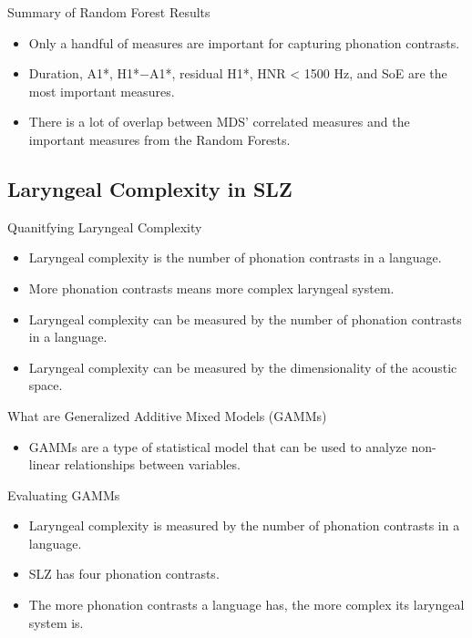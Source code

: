 \documentclass[professionalfont]{beamer}
\begin{document}
\begin{frame}{Summary of Random Forest Results}
  \begin{itemize}
    \item Only a handful of measures are important for capturing phonation contrasts.
    \item Duration, A1*, H1*$-$A1*, residual H1*, HNR < 1500 Hz, and SoE are the most important measures.
    \item There is a lot of overlap between MDS' correlated measures and the important measures from the Random Forests.
  \end{itemize}
\end{frame}

\subsection{Laryngeal Complexity in SLZ}

\begin{frame}{Quanitfying Laryngeal Complexity}
  \begin{itemize}
    \item Laryngeal complexity is the number of phonation contrasts in a language.
    \item More phonation contrasts means more complex laryngeal system.
    \item Laryngeal complexity can be measured by the number of phonation contrasts in a language.
    \item Laryngeal complexity can be measured by the dimensionality of the acoustic space.
  \end{itemize}
\end{frame}

\begin{frame}{What are Generalized Additive Mixed Models (GAMMs)}
  \begin{itemize}
    \item GAMMs are a type of statistical model that can be used to analyze non-linear relationships between variables.
  \end{itemize}
\end{frame}

\begin{frame}{Evaluating GAMMs}
  \begin{itemize}
    \item Laryngeal complexity is measured by the number of phonation contrasts in a language.
    \item SLZ has four phonation contrasts.
    \item The more phonation contrasts a language has, the more complex its laryngeal system is.
  \end{itemize}
\end{frame}
\end{document}
